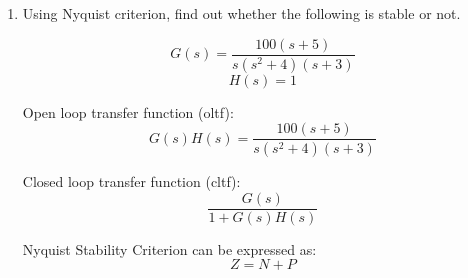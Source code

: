\begin{enumerate}[label=\thesubsection.\arabic*.,ref=\thesubsection.\theenumi]

\item Using Nyquist criterion, find out whether the following is stable or not.

\begin{equation}
    G(s) = \frac{100(s+5)}{s(s^2+4)(s+3)}
\end{equation}
\begin{equation}
    H(s) = 1
\end{equation}

\solution
Open loop transfer function (oltf):
\begin{equation} \label{eq:1}
    G(s)H(s) = \frac{100(s+5)}{s(s^2+4)(s+3)}
\end{equation}

Closed loop transfer function (cltf):
\begin{equation} \label{eq:2}
    \frac{G(s)}{1+G(s)H(s)}
\end{equation}

Nyquist Stability Criterion can be expressed as:
\begin{equation} \label{eq:3}
    Z = N + P
\end{equation}


\end{enumerate}
